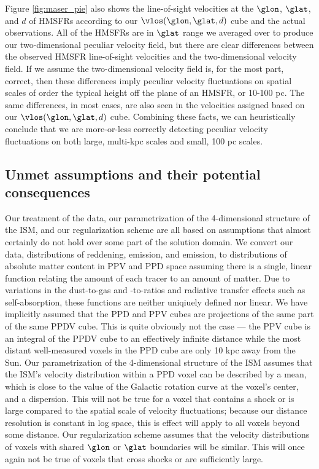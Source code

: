 Figure \ref{fig:maser_pie} also shows the line-of-sight velocities at the $\glon$, $\glat$, and $d$ of HMSFRs according to our $\vlos(\glon, \glat, d)$ cube and the actual observations.
All of the HMSFRs are in $\glat$ range we averaged over to produce our two-dimensional peculiar velocity field, but there are clear differences between the observed HMSFR line-of-sight velocities and the two-dimensional velocity field. 
If we assume the two-dimensional velocity field is, for the most part, correct, then these differences imply peculiar velocity fluctuations on spatial scales of order the typical height off the plane of an HMSFR, or 10-100 pc. 
The same differences, in most cases, are also seen in the velocities assigned based on our $\vlos(\glon, \glat, d)$ cube. 
Combining these facts, we can heuristically conclude that we are more-or-less correctly detecting peculiar velocity fluctuations on both large, multi-kpc scales and small, 100 pc scales. 

\subsection{Unmet assumptions and their potential consequences}
\label{sec:discussion-systematics}
Our treatment of the data, our parametrization of the 4-dimensional structure of the ISM, and our regularization scheme are all based on assumptions that almost certainly do not hold over some part of the solution domain. 
We convert our data, distributions of reddening, \atomH{} emission, and \CO emission, to distributions of absolute matter content in PPV and PPD space assuming there is a single, linear function relating the amount of each tracer to an amount of matter.
Due to variations in the dust-to-gas and \CO-to-\molH ratios and radiative transfer effects such as self-absorption, these functions are neither uniqiuely defined nor linear. 
We have implicitly assumed that the PPD and PPV cubes are projections of the same part of the same PPDV cube. 
This is quite obviously not the case --- the PPV cube is an integral of the PPDV cube to an effectively infinite distance while the most distant well-measured voxels in the PPD cube are only 10 kpc away from the Sun.
Our parametrization of the 4-dimensional structure of the ISM assumes that the ISM's velocity distribution within a PPD voxel can be described by a mean, which is close to the value of the Galactic rotation curve at the voxel's center, and a dispersion.  
This will not be true for a voxel that contains a shock or is large compared to the spatial scale of velocity fluctuations; because our distance resolution is constant in log space, this is effect will apply to all voxels beyond some distance. 
Our regularization scheme assumes that the velocity distributions of voxels with shared $\glon$ or $\glat$ boundaries will be similar. 
This will once again not be true of voxels that cross shocks or are sufficiently large. 

